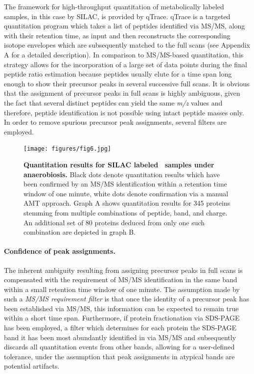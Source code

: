 The framework for high-throughput quantitation of metabolically labeled 
samples, in this case by SILAC, is provided by qTrace.
qTrace is a targeted quantitation program which takes a list of peptides
identified via MS/MS, along with their retention time, as input and then 
reconstructs the corresponding isotope envelopes which are subsequently 
matched to the full scans (see Appendix A for a detailed description).
In comparison to MS/MS-based quantitation, this strategy allows for the
incorporation of a large set of data points during the final peptide ratio
estimation because peptides usually elute for a time span long enough to
show their precursor peaks in several successive full scans.
It is obvious that the assignment of precursor peaks in full scans is highly
ambiguous, given the fact that several distinct peptides can yield the
same {\em m/z} values and therefore, peptide identification is not possible
using intact peptide masses only.
In order to remove spurious precursor peak assignments, several filters are 
employed.

\begin{figure}
\texttt{[image: figures/fig6.jpg]}
\caption{
{\bf Quantitation results for SILAC labeled \cre~samples under anaerobiosis.} 
Black dots denote quantitation results which have been confirmed by an
MS/MS identification within a retention time window of one minute, white dots
denote confirmation via a manual AMT approach.
Graph A shows quantitation results for 345 proteins stemming from multiple 
combinations of peptide, band, and charge. An additional set of 80 proteins 
deduced from only one such combination are depicted in graph B.
}
\label{fig:qtrace-mia}
\end{figure}

\paragraph{Confidence of peak assignments.}

The inherent ambiguity resulting from assigning precursor peaks in full scans
is compensated with the requirement of MS/MS identification in the same band
within a small retention time window of one minute.
The assumption made by such a {\em MS/MS requirement filter} is that once the
identity of a precursor peak has been established via MS/MS, this information
can be expected to remain true within a short time span.
Furthermore, if protein fractionation via SDS-PAGE has been employed, a filter
which determines for each protein the SDS-PAGE band it has been most abundantly
identified in via MS/MS and subsequently discards all quantitation events
from other bands, allowing for a user-defined tolerance, under the assumption
that peak assignments in atypical bands are potential artifacts.

